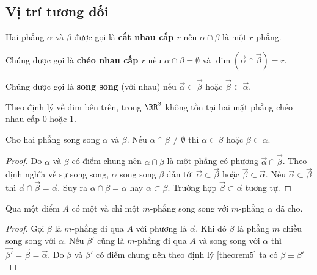 \subsection*{Vị trí tương đối}

\begin{definition}
    Hai phẳng $\alpha$ và $\beta$ được gọi là \textbf{cắt nhau cấp $r$} nếu $\alpha \cap \beta$ là một $r$-phẳng. 
    
    Chúng được gọi là \textbf{chéo nhau cấp $r$} nếu $\alpha \cap \beta = \emptyset$ và $\dim(\overrightarrow{\alpha} \cap \overrightarrow{\beta}) = r$. 
    
    Chúng được gọi là \textbf{song song} (với nhau) nếu $\overrightarrow{\alpha} \subset \overrightarrow{\beta}$ hoặc $\overrightarrow{\beta} \subset \overrightarrow{\alpha}$. 
\end{definition}

Theo định lý về dim bên trên, trong $\RR^3$ không tồn tại hai mặt phẳng chéo nhau cấp 0 hoặc 1.

\begin{theorem}
    \label{theorem5}
    Cho hai phẳng  song song $\alpha$ và $\beta$. Nếu $\alpha \cap \beta \neq \emptyset$ thì $\alpha \subset \beta$ hoặc $\beta \subset \alpha$.
\end{theorem}

\begin{proof}
	Do $\alpha$ và $\beta$ có điểm chung nên $\alpha \cap \beta$ là một phẳng có phương $\overrightarrow{\alpha} \cap \overrightarrow{\beta}$. Theo định nghĩa về sự song song, $\alpha$ song song $\beta$ dẫn tới $\overrightarrow{\alpha} \subset \overrightarrow{\beta}$ hoặc $\overrightarrow{\beta} \subset \overrightarrow{\alpha}$. Nếu $\overrightarrow{\alpha} \subset \overrightarrow{\beta}$ thì $\overrightarrow{\alpha} \cap \overrightarrow{\beta} = \overrightarrow{\alpha}$. Suy ra $\alpha \cap \beta = \alpha$ hay $\alpha \subset \beta$. Trường hợp $\overrightarrow{\beta} \subset \overrightarrow{\alpha}$ tương tự.
\end{proof}

\begin{theorem}
    Qua một điểm $A$ có một và chỉ một $m$-phẳng song song với $m$-phẳng $\alpha$ đã cho.
\end{theorem}

\begin{proof}
	Gọi $\beta$ là $m$-phẳng đi qua $A$ với phương là $\overrightarrow{\alpha}$. Khi đó $\beta$ là phẳng $m$ chiều song song với $\alpha$. Nếu $\beta'$ cũng là $m$-phẳng đi qua $A$ và song song với $\alpha$ thì $\overrightarrow{\beta'} = \overrightarrow{\beta} = \overrightarrow{\alpha}$. Do $\beta$ và $\beta'$ có điểm chung nên theo định lý \ref{theorem5} ta có $\beta \equiv \beta'$
\end{proof}

